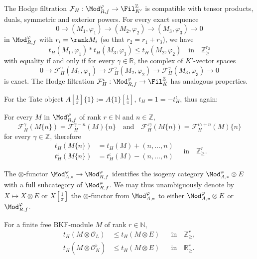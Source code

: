 \begin{prop}\label{prop:Hodge4A=00005B1/pi=00005D_tensorexact}
The Hodge filtration $\mathcal{F}_{H}:\Mod_{R,f}^{\varphi}\rightarrow\Fil_{K^{\prime}}^{\mathbb{Z}}$ is compatible with tensor products, duals, symmetric and exterior powers. For every exact sequence
\[
0\rightarrow(M_{1},\varphi_{1})\rightarrow(M_{2},\varphi_{2})\rightarrow(M_{3},\varphi_{3})\rightarrow0
\]
in $\Mod_{R,f}^{\varphi}$ with $r_{i}=\rank M_{i}$ (so that $r_{2}=r_{1}+r_{3}$), we have
\[
t_{H}(M_{1},\varphi_{1})\ast t_{H}(M_{3},\varphi_{3})\leq t_{H}(M_{2},\varphi_{2})\quad\text{in}\quad\mathbb{Z}_{\geq}^{r_{2}}
\]
with equality if and only if for every $\gamma\in\mathbb{R}$, the complex of $K'$-vector spaces
\[
0\rightarrow\mathcal{F}_{H}^{\gamma}(M_{1},\varphi_{1})\rightarrow\mathcal{F}_{H}^{\gamma}(M_{2},\varphi_{2})\rightarrow\mathcal{F}_{H}^{\gamma}(M_{3},\varphi_{3})\rightarrow0
\]
is exact. The Hodge filtration $\mathcal{F}_{H}^{\iota}:\Mod_{R,f}^{\varphi}\rightarrow\Fil_{K}^{\mathbb{Z}}$ has analogous properties.
\end{prop}

For the Tate object $A[\frac{1}{\pi}]\{1\}:=A\{1\}[\frac{1}{\pi}]$, $t_{H}=1=-t_{H}^{\iota}$, thus again:

\begin{prop}\label{prop:t_H(twist)4A=00005B1/pi=00005D}
For every $M$ in $\Mod_{R,f}^{\varphi}$ of rank $r\in\mathbb{N}$ and $n\in\mathbb{Z}$,
\[
\mathcal{F}_{H}^{\gamma}(M\{n\})=\mathcal{F}_{H}^{\gamma-n}(M)\{n\}\quad\text{and}\quad\mathcal{F}_{H}^{\iota\gamma}(M\{n\})=\mathcal{F}_{H}^{\iota\gamma+n}(M)\{n\}
\]
for every $\gamma\in\mathbb{Z}$, therefore
\[
\begin{aligned}
t_{H}(M\{n\}) & = t_{H}(M)+(n,\dots,n)\\
t_{H}^{\iota}(M\{n\}) & = t_{H}^{\iota}(M)-(n,\dots,n)
\end{aligned}\quad\text{in}\quad\mathbb{Z}_{\geq}^{r}.
\]
\end{prop}

The $\otimes$-functor $\Mod_{A,\ast}^{\varphi}\rightarrow\Mod_{R,f}^{\varphi}$ identifies the isogeny category $\Mod_{A,\ast}^{\varphi}\otimes E$ with a full subcategory of $\Mod_{R,f}^{\varphi}$. We may thus unambiguously denote by $X\mapsto X\otimes E$ or $X[\frac{1}{\pi}]$ the $\otimes$-functor from $\Mod_{A,\ast}^{\varphi}$ to either $\Mod_{A,\ast}^{\varphi}\otimes E$ or $\Mod_{R,f}^{\varphi}$.

\begin{prop}\label{prop:CompHodgeA=00005B1/pi=00005DOLA1}
For a finite free BKF-module $M$ of rank $r\in\mathbb{N}$,
\[
\begin{aligned}
t_{H}(M\otimes\mathcal{O}_{L}) & \leq t_{H}\left(M\otimes E\right) && \text{in}\quad\mathbb{Z}_{\geq}^{r},\\
t_{H}(M\otimes\mathcal{O}_{K}^{\flat}) & \leq t_{H}\left(M\otimes E\right) && \text{in}\quad\mathbb{R}_{\geq}^{r}.
\end{aligned}
\]
\end{prop}

